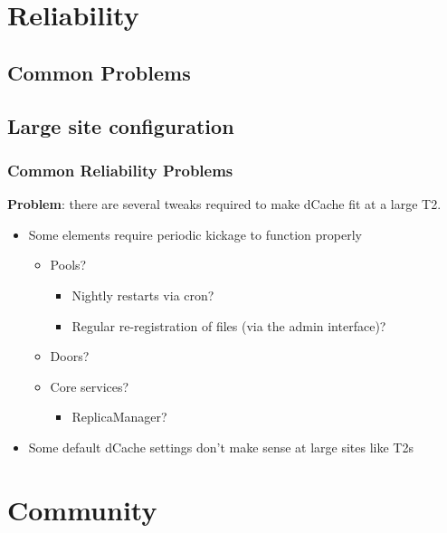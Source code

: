 \documentclass{beamer}
\begin{document}
\section{Reliability}
\subsection{Common Problems}
\subsection{Large site configuration}
\begin{frame}
\frametitle{Common Reliability Problems}
{\large {\bf Problem}: there are several tweaks required to make dCache fit at a large T2.}
\vspace{1 cm}
\begin{itemize}
    \item Some elements require periodic kickage to function properly
    \begin{itemize}
        \item Pools?
        \begin{itemize}
            \item Nightly restarts via cron?
            \item Regular re-registration of files (via the admin interface)?
        \end{itemize}
        \item Doors?
        \item Core services?
        \begin{itemize}
            \item ReplicaManager?
        \end{itemize}
    \end{itemize}
    \item Some default dCache settings don't make sense at large sites like T2s
\end{itemize}
\end{frame}

\section{Community}
\end{document}
